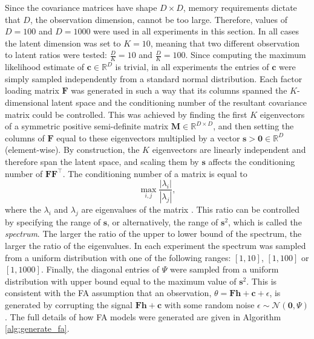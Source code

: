 \documentclass[msc,deptreport.inf]{infthesis} %
\newcommand{\matr}[1]{\mathbf{#1}}
\newcommand{\R}{\mathbb R}
\begin{document}
Since the covariance matrices have shape $D \times D$, memory requirements dictate that $D$, the observation dimension, cannot be too large. Therefore, values of $D=100$ and $D=1000$ were used in all experiments in this section. In all cases the latent dimension was set to $K=10$, meaning that two different observation to latent ratios were tested: $\frac{D}{K} = 10$ and $\frac{D}{K} = 100$. Since computing the maximum likelihood estimate of $\matr{c} \in \R^D$ is trivial, in all experiments the entries of $\matr{c}$ were simply sampled independently from a standard normal distribution. Each factor loading matrix $\matr{F}$ was generated in such a way that its columns spanned the $K$-dimensional latent space and the conditioning number of the resultant covariance matrix could be controlled. This was achieved by finding the first $K$ eigenvectors of a symmetric positive semi-definite matrix $\matr{M} \in \R^{D \times D}$, and then setting the columns of $\matr{F}$ equal to these eigenvectors multiplied by a vector $\matr{s} > \matr{0} \in \R^D$ (element-wise). By construction, the $K$ eigenvectors are linearly independent and therefore span the latent space, and scaling them by $\matr{s}$ affects the conditioning number of $\matr{F}\matr{F}^\intercal$. The conditioning number of a matrix is equal to
\begin{equation}
	\max_{i, j} \frac{| \lambda_i |}{| \lambda_j |},
\end{equation}
where the $\lambda_i$ and $\lambda_j$ are eigenvalues of the matrix \cite{goodfellow2016}. This ratio can be controlled by specifying the  range of $\matr{s}$, or alternatively, the range of $\matr{s}^2$, which is called the \emph{spectrum}. The larger the ratio of the upper to lower bound of the spectrum, the larger the ratio of the eigenvalues. In each experiment the spectrum was sampled from a uniform distribution with one of the following ranges: $[1, 10]$, $[1, 100]$ or $[1, 1000]$. Finally, the diagonal entries of $\Psi$ were sampled from a uniform distribution with upper bound equal to the maximum value of $\matr{s}^2$. This is consistent with the FA assumption that an observation, $\theta = \matr{Fh} + \matr{c} + \epsilon$, is generated by corrupting the signal $\matr{Fh} + \matr{c}$ with some random noise $\epsilon \sim \mathcal{N}(\matr{0}, \Psi)$. The full details of how FA models were generated are given in Algorithm \ref{alg:generate_fa}.
\end{document}

